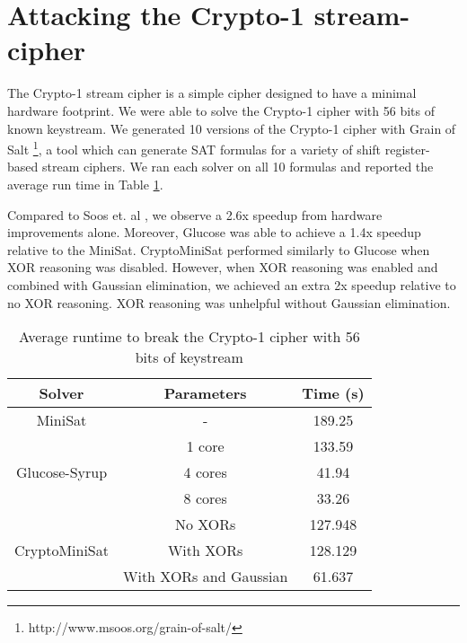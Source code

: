 \section{Attacking the Crypto-1 stream-cipher}
The Crypto-1 stream cipher is a simple cipher designed to have a minimal hardware footprint. We were able to solve the Crypto-1 cipher with 56 bits of known keystream. We generated 10 versions of the Crypto-1 cipher with Grain of Salt \footnote{http://www.msoos.org/grain-of-salt/}, a tool which can generate SAT formulas for a variety of shift register-based stream ciphers. We ran each solver on all 10 formulas and reported the average run time in Table \ref{table:crypto1:runtime}.

Compared to Soos et. al \cite{SNC09}, we observe a 2.6x speedup from hardware improvements alone. Moreover, Glucose was able to achieve a 1.4x speedup relative to the MiniSat. CryptoMiniSat performed similarly to Glucose when XOR reasoning was disabled. However, when XOR reasoning was enabled and combined with Gaussian elimination, we achieved an extra 2x speedup relative to no XOR reasoning. XOR reasoning was unhelpful without Gaussian elimination.

\begin{table}[!htbp]
	\centering
	\begin{tabular}{|c|c|c|}
		\hline
		\textbf{Solver} & \textbf{Parameters} & \textbf{Time (s)} \\
		\hline
		MiniSat & - & 189.25 \\
		\hline
		\multirow{3}{*}{Glucose-Syrup} & 1 core & 133.59 \\ \cline{2-3}
		& 4 cores & 41.94 \\ \cline{2-3}
		& 8 cores & 33.26 \\
		\hline
		
		\multirow{3}{*}{CryptoMiniSat} & No {XORs} & 127.948 \\ \cline{2-3} 
		& With {XORs} & 128.129 \\ \cline{2-3} 
		& With {XORs} and Gaussian & 61.637 \\ \cline{2-3}
		\hline
	\end{tabular}
	
	\caption{Average runtime to break the Crypto-1 cipher with 56 bits of keystream}
	\label{table:crypto1:runtime}
\end{table}